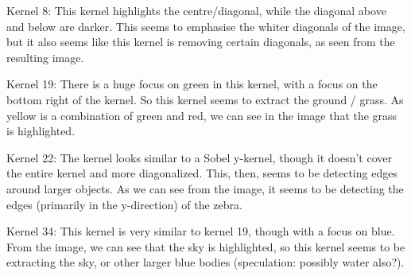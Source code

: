 Kernel 8: 
This kernel highlights the centre/diagonal, while the diagonal above and below are darker. This seems to emphasise the whiter diagonals of the image, but it also seems like this kernel is removing certain diagonals, as seen from the resulting image. 


Kernel 19: 
There is a huge focus on green in this kernel, with a focus on the bottom right of the kernel. So this kernel seems to extract the ground / grass. As yellow is a combination of green and red, we can see in the image that the grass is highlighted. 


Kernel 22: 
The kernel looks similar to a Sobel y-kernel, though it doesn't cover the entire kernel and more diagonalized.  This, then, seems to be detecting edges around larger objects. As we can see from the image, it seems to be detecting the edges (primarily in the y-direction) of the zebra. 


Kernel 34: 
This kernel is very similar to kernel 19, though with a focus on blue. From the image, we can see that the sky is highlighted, so this kernel seems to be extracting the sky, or other larger blue bodies (speculation: possibly water also?). 
